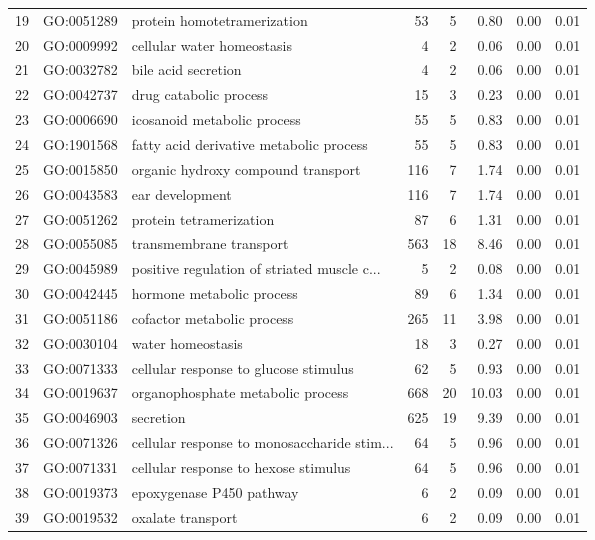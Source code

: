 \begin{table}[ht]
\begin{tabular}{rllrrrrr}
  19 & GO:0051289 & protein homotetramerization &  53 &   5 & 0.80 & 0.00 & 0.01 \\ 
  20 & GO:0009992 & cellular water homeostasis &   4 &   2 & 0.06 & 0.00 & 0.01 \\ 
  21 & GO:0032782 & bile acid secretion &   4 &   2 & 0.06 & 0.00 & 0.01 \\ 
  22 & GO:0042737 & drug catabolic process &  15 &   3 & 0.23 & 0.00 & 0.01 \\ 
  23 & GO:0006690 & icosanoid metabolic process &  55 &   5 & 0.83 & 0.00 & 0.01 \\ 
  24 & GO:1901568 & fatty acid derivative metabolic process &  55 &   5 & 0.83 & 0.00 & 0.01 \\ 
  25 & GO:0015850 & organic hydroxy compound transport & 116 &   7 & 1.74 & 0.00 & 0.01 \\ 
  26 & GO:0043583 & ear development & 116 &   7 & 1.74 & 0.00 & 0.01 \\ 
  27 & GO:0051262 & protein tetramerization &  87 &   6 & 1.31 & 0.00 & 0.01 \\ 
  28 & GO:0055085 & transmembrane transport & 563 &  18 & 8.46 & 0.00 & 0.01 \\ 
  29 & GO:0045989 & positive regulation of striated muscle c... &   5 &   2 & 0.08 & 0.00 & 0.01 \\ 
  30 & GO:0042445 & hormone metabolic process &  89 &   6 & 1.34 & 0.00 & 0.01 \\ 
  31 & GO:0051186 & cofactor metabolic process & 265 &  11 & 3.98 & 0.00 & 0.01 \\ 
  32 & GO:0030104 & water homeostasis &  18 &   3 & 0.27 & 0.00 & 0.01 \\ 
  33 & GO:0071333 & cellular response to glucose stimulus &  62 &   5 & 0.93 & 0.00 & 0.01 \\ 
  34 & GO:0019637 & organophosphate metabolic process & 668 &  20 & 10.03 & 0.00 & 0.01 \\ 
  35 & GO:0046903 & secretion & 625 &  19 & 9.39 & 0.00 & 0.01 \\ 
  36 & GO:0071326 & cellular response to monosaccharide stim... &  64 &   5 & 0.96 & 0.00 & 0.01 \\ 
  37 & GO:0071331 & cellular response to hexose stimulus &  64 &   5 & 0.96 & 0.00 & 0.01 \\ 
  38 & GO:0019373 & epoxygenase P450 pathway &   6 &   2 & 0.09 & 0.00 & 0.01 \\ 
  39 & GO:0019532 & oxalate transport &   6 &   2 & 0.09 & 0.00 & 0.01 \\ 

\end{tabular}
\end{table}

